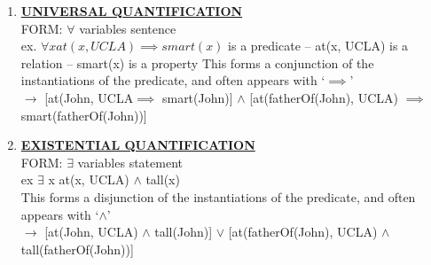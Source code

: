 \documentclass[../../lecture_notes.tex]{subfiles}
\begin{document}
	\begin{enumerate} [itemsep=0mm]
		\item \textbf{\underline{UNIVERSAL QUANTIFICATION}}\\
			FORM: $\forall$ variables sentence\\
			ex. $\forall x at(x, UCLA) \implies smart(x)$ is a predicate
				-- at(x, UCLA) is a relation
				-- smart(x) is a property
			This forms a conjunction of the instantiations of the predicate, and often appears with ‘$\implies$’\\
			$\rightarrow$	[at(John, UCLA$\implies$ smart(John)] $\land$ 
						[at(fatherOf(John), UCLA) $\implies$ smart(fatherOf(John))]
		\item \textbf{\underline{EXISTENTIAL QUANTIFICATION}}\\
			FORM: $\exists$ variables statement\\
			ex $\exists$ x at(x, UCLA) $\land$ tall(x)\\
			This forms a disjunction of the instantiations of the predicate, and often appears with ‘$\land$’\\
			$\rightarrow$ [at(John, UCLA) $\land$ tall(John)] $\lor$ 
						 [at(fatherOf(John), UCLA) $\land$ tall(fatherOf(John))]
	\end{enumerate}
\end{document}
